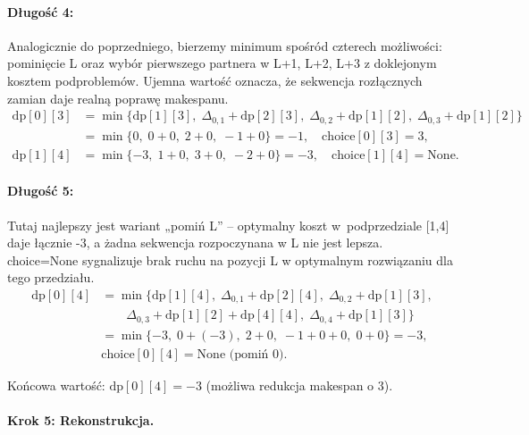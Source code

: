 \paragraph{Długość 4:} Analogicznie do poprzedniego, bierzemy minimum spośród czterech możliwości: pominięcie L oraz wybór pierwszego partnera w {L+1, L+2, L+3} z doklejonym kosztem podproblemów. Ujemna wartość oznacza, że sekwencja rozłącznych zamian daje realną poprawę makespanu.
\begin{equation}\label{dp_len_4}
\begin{aligned}
\mathrm{dp}[0][3] &= \min\{\mathrm{dp}[1][3], \; \Delta_{0,1} + \mathrm{dp}[2][3], \; \Delta_{0,2} + \mathrm{dp}[1][2], \; \Delta_{0,3} + \mathrm{dp}[1][2]\} \\
&= \min\{0, \; 0 + 0, \; 2 + 0, \; -1 + 0\} = -1, \quad \mathrm{choice}[0][3] = 3, \\
\mathrm{dp}[1][4] &= \min\{-3, \; 1 + 0, \; 3 + 0, \; -2 + 0\} = -3, \quad \mathrm{choice}[1][4] = \text{None}.
\end{aligned}
\end{equation}

\paragraph{Długość 5:} Tutaj najlepszy jest wariant „pomiń L” -- optymalny koszt w~podprzedziale [1,4] daje łącznie -3, a żadna sekwencja rozpoczynana w L nie jest lepsza. choice=None sygnalizuje brak ruchu na pozycji L w optymalnym rozwiązaniu dla tego przedziału.
\begin{equation}\label{dp_len_5}
\begin{aligned}
\mathrm{dp}[0][4] &= \min\{\mathrm{dp}[1][4], \; \Delta_{0,1} + \mathrm{dp}[2][4], \; \Delta_{0,2} + \mathrm{dp}[1][3], \\
& \qquad \Delta_{0,3} + \mathrm{dp}[1][2] + \mathrm{dp}[4][4], \; \Delta_{0,4} + \mathrm{dp}[1][3]\} \\
&= \min\{-3, \; 0 + (-3), \; 2 + 0, \; -1 + 0 + 0, \; 0 + 0\} = -3, \\
& \mathrm{choice}[0][4] = \text{None (pomiń 0)}.
\end{aligned}
\end{equation}

Końcowa wartość: $\mathrm{dp}[0][4] = -3$ (możliwa redukcja makespan o 3).

\paragraph{Krok 5: Rekonstrukcja.}

